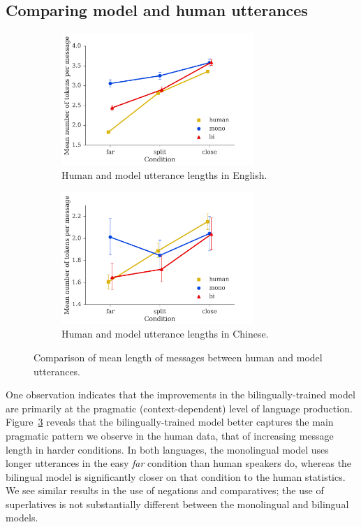 \documentclass[11pt,a4paper]{article}
\renewcommand{\|}{\mid}
\newcommand{\figref}[1]{Figure~\ref{#1}}
\begin{document}
\subsection{Comparing model and human utterances}

\begin{figure}[!t]
    \begin{subfigure}[b]{\columnwidth}
    \centering
    \includegraphics[width=0.8\textwidth]{models_en_tokens.png}
    \caption{Human and model utterance lengths in English.}
    \label{fig:models_length:en}
    \end{subfigure}

    \begin{subfigure}[b]{\columnwidth}
    \centering
    \includegraphics[width=0.8\textwidth]{models_zh_tokens.png}
    \caption{Human and model utterance lengths in Chinese.}
    \label{fig:models_length:zh}
    \end{subfigure}
\caption{Comparison of mean length of messages between human and model utterances.}
\label{fig:models_length}
\end{figure}

One observation indicates that the improvements in the bilingually-trained model are primarily at the pragmatic (context-dependent) level of language production. \figref{fig:models_length} reveals that the bilingually-trained model better
captures the main pragmatic pattern we observe in the human data, that of increasing message length in harder conditions. In both languages, the monolingual model
uses longer utterances in the easy \emph{far} condition than human speakers do, whereas the bilingual model is
significantly closer on that condition to the human statistics. We see similar results in the use of negations
and comparatives; the use of superlatives is not substantially different between the monolingual and bilingual
models.
\end{document}
